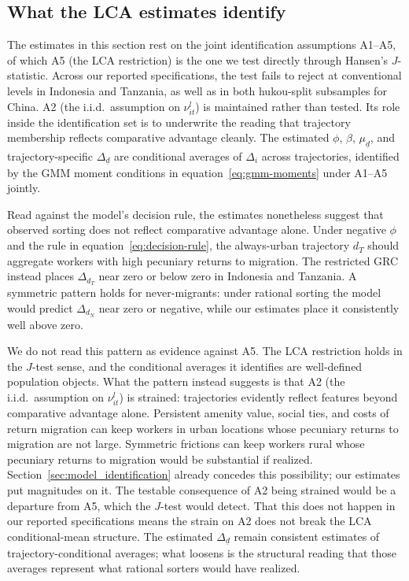 
\subsection{What the LCA estimates identify}\label{sec:interpretation}

The estimates in this section rest on the joint identification assumptions A1--A5, of which A5 (the LCA restriction) is the one we test directly through Hansen's $J$-statistic.
Across our reported specifications, the test fails to reject at conventional levels in Indonesia and Tanzania, as well as in both hukou-split subsamples for China.
A2 (the i.i.d.\ assumption on $\nu_{it}^l$) is maintained rather than tested.
Its role inside the identification set is to underwrite the reading that trajectory membership reflects comparative advantage cleanly.
The estimated $\phi$, $\beta$, $\mu_{\underline{d}}$, and trajectory-specific $\Delta_{\underline{d}}$ are conditional averages of $\Delta_i$ across trajectories, identified by the GMM moment conditions in equation~\eqref{eq:gmm-moments} under A1--A5 jointly.

Read against the model's decision rule, the estimates nonetheless suggest that observed sorting does not reflect comparative advantage alone.
Under negative $\phi$ and the rule in equation~\eqref{eq:decision-rule}, the always-urban trajectory $d_T$ should aggregate workers with high pecuniary returns to migration.
The restricted GRC instead places $\Delta_{d_T}$ near zero or below zero in Indonesia and Tanzania.
A symmetric pattern holds for never-migrants: under rational sorting the model would predict $\Delta_{d_N}$ near zero or negative, while our estimates place it consistently well above zero.

We do not read this pattern as evidence against A5.
The LCA restriction holds in the $J$-test sense, and the conditional averages it identifies are well-defined population objects.
What the pattern instead suggests is that A2 (the i.i.d.\ assumption on $\nu_{it}^l$) is strained: trajectories evidently reflect features beyond comparative advantage alone.
Persistent amenity value, social ties, and costs of return migration can keep workers in urban locations whose pecuniary returns to migration are not large.
Symmetric frictions can keep workers rural whose pecuniary returns to migration would be substantial if realized.
Section~\ref{sec:model_identification} already concedes this possibility; our estimates put magnitudes on it.
The testable consequence of A2 being strained would be a departure from A5, which the $J$-test would detect.
That this does not happen in our reported specifications means the strain on A2 does not break the LCA conditional-mean structure.
The estimated $\Delta_{\underline{d}}$ remain consistent estimates of trajectory-conditional averages; what loosens is the structural reading that those averages represent what rational sorters would have realized.

